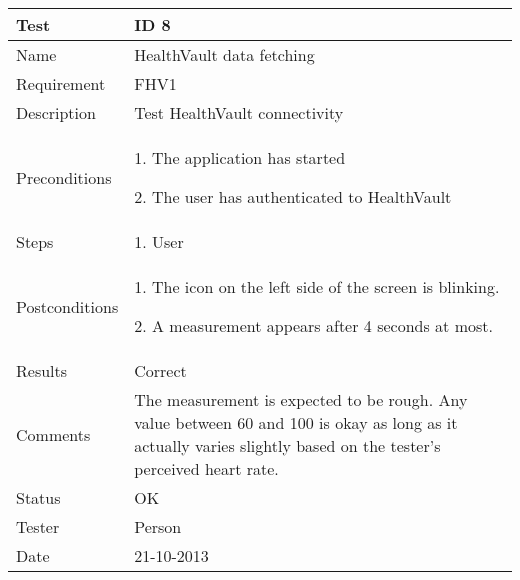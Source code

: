 \begin{table}
\begin{center}
\begin{tabular}{ | l | p{10cm} | }
	\hline
	\textbf{Test}	&	\textbf{ID 8} \\
	\hline\noalign{\smallskip}\noalign{\smallskip}\hline
	Name				& HealthVault data fetching \\
	Requirement			& FHV1 \\
	Description			& Test HealthVault connectivity \\
	Preconditions		&	\par 1. The application has started
							\par 2. The user has authenticated to HealthVault \\
	Steps 				&	\par 1. User \\
	Postconditions		&	\par 1. The icon on the left side of the screen is blinking.
							\par 2. A measurement appears after 4 seconds at most.\\
	Results				& Correct \\
	Comments			&	The measurement is expected to be rough.
							Any value between 60 and 100 is okay as long as it actually varies slightly based
							on the tester's perceived heart rate.  \\
	Status				& OK \\
	Tester				& Person \\
	Date				& 21-10-2013 \\
	\hline
\end{tabular}
\end{center}
\end{table}

